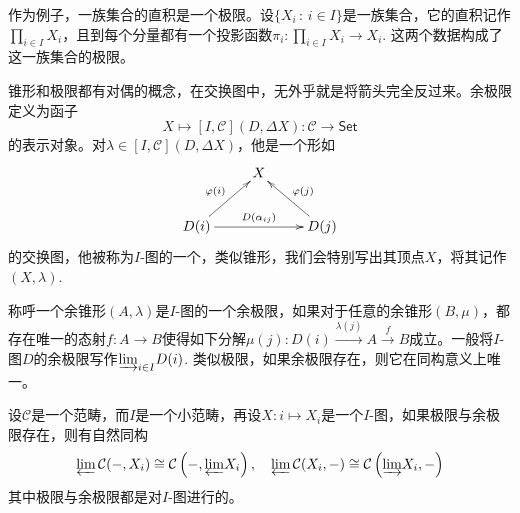 作为例子，一族集合的直积是一个极限。设$\{X_i\,:\, i\in I\}$是一族集合，它的直积记作$\prod_{i\in I}X_i$，且到每个分量都有一个投影函数$\pi_i:\prod_{i\in I}X_i\to X_i$. 这两个数据构成了这一族集合的极限。

\begin{para}
锥形和极限都有对偶的概念，在交换图中，无外乎就是将箭头完全反过来。余极限定义为函子
\[
	X\mapsto [I,\mathcal{C}](D,\Delta X):\mathcal{C}\to \mathsf{Set}
\]
的表示对象。对$\lambda\in [I,\mathcal{C}](D,\Delta X)$，他是一个形如
\[
	\xymatrix{
		&X&\\
		D(i)\ar[rr]^-{D(\alpha_{ij})}\ar[ur]^{\varphi(i)}&&D(j)\ar[ul]_{\varphi(j)}
	}
\]
的交换图，他被称为$I$-图的一个，类似锥形，我们会特别写出其顶点$X$，将其记作$(X,\lambda)$.

称呼一个余锥形$(A,\lambda)$是$I$-图的一个{余极限}，如果对于任意的余锥形$(B,\mu)$，都存在唯一的态射$f:A\to B$使得如下分解$\mu(j):D(i)\xrightarrow{\lambda(j)}A\xrightarrow{f}B$成立。一般将$I$-图$D$的余极限写作${\varinjlim}_{i\in I} D(i)$. 类似极限，如果余极限存在，则它在同构意义上唯一。
\end{para}

\begin{pro}\label{homlimit}
设$\mathcal{C}$是一个范畴，而$I$是一个小范畴，再设$X:i\mapsto X_i$是一个$I$-图，如果极限与余极限存在，则有自然同构
\[
	{\varprojlim}\,\mathcal{C}(-,X_i)\cong \mathcal{C}\left(-,{\varprojlim} X_i\right),\quad {\varprojlim}\,\mathcal{C}(X_i,-)\cong  \mathcal{C}\left({\varinjlim} X_i,-\right)
\]
其中极限与余极限都是对$I$-图进行的。
\end{pro}

